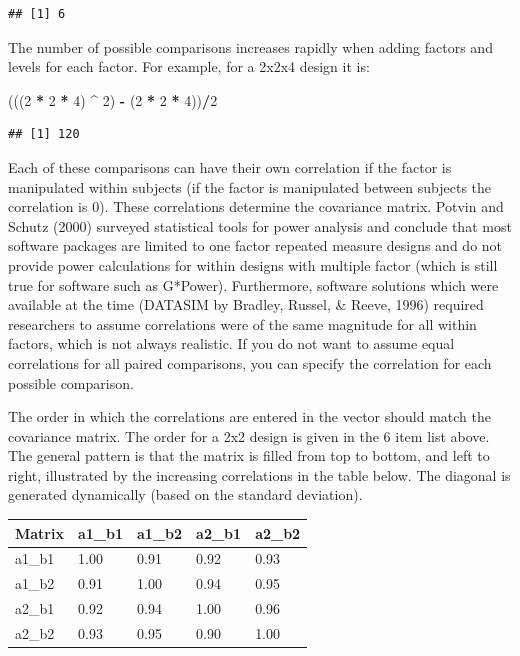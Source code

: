 \documentclass[
]{book}
\newenvironment{Shaded}{\begin{snugshade}}{\end{snugshade}}
\newcommand{\DecValTok}[1]{\textcolor[rgb]{0.00,0.00,0.81}{#1}}
\newcommand{\NormalTok}[1]{#1}
\newcommand{\OperatorTok}[1]{\textcolor[rgb]{0.81,0.36,0.00}{\textbf{#1}}}
\newcommand{\StringTok}[1]{\textcolor[rgb]{0.31,0.60,0.02}{#1}}
\begin{document}
\begin{verbatim}
## [1] 6
\end{verbatim}

The number of possible comparisons increases rapidly when adding factors and levels for each factor. For example, for a 2x2x4 design it is:

\begin{Shaded}
\begin{Highlighting}[]
\NormalTok{(((}\DecValTok{2} \OperatorTok{*}\StringTok{ }\DecValTok{2} \OperatorTok{*}\StringTok{ }\DecValTok{4}\NormalTok{) }\OperatorTok{^}\StringTok{ }\DecValTok{2}\NormalTok{) }\OperatorTok{-}\StringTok{ }\NormalTok{(}\DecValTok{2} \OperatorTok{*}\StringTok{ }\DecValTok{2} \OperatorTok{*}\StringTok{ }\DecValTok{4}\NormalTok{))}\OperatorTok{/}\DecValTok{2}
\end{Highlighting}
\end{Shaded}

\begin{verbatim}
## [1] 120
\end{verbatim}

Each of these comparisons can have their own correlation if the factor is manipulated within subjects (if the factor is manipulated between subjects the correlation is 0). These correlations determine the covariance matrix. Potvin and Schutz (2000) surveyed statistical tools for power analysis and conclude that most software packages are limited to one factor repeated measure designs and do not provide power calculations for within designs with multiple factor (which is still true for software such as G*Power). Furthermore, software solutions which were available at the time (DATASIM by Bradley, Russel, \& Reeve, 1996) required researchers to assume correlations were of the same magnitude for all within factors, which is not always realistic. If you do not want to assume equal correlations for all paired comparisons, you can specify the correlation for each possible comparison.

The order in which the correlations are entered in the vector should match the covariance matrix.
The order for a 2x2 design is given in the 6 item list above. The general pattern is that the matrix is filled from top to bottom, and left to right, illustrated by the increasing correlations in the table below.
The diagonal is generated dynamically (based on the standard deviation).

\begin{longtable}[]{@{}lllll@{}}
\toprule
Matrix & a1\_b1 & a1\_b2 & a2\_b1 & a2\_b2\tabularnewline
\midrule
\endhead
a1\_b1 & 1.00 & 0.91 & 0.92 & 0.93\tabularnewline
a1\_b2 & 0.91 & 1.00 & 0.94 & 0.95\tabularnewline
a2\_b1 & 0.92 & 0.94 & 1.00 & 0.96\tabularnewline
a2\_b2 & 0.93 & 0.95 & 0.90 & 1.00\tabularnewline
\bottomrule
\end{longtable}
\end{document}
